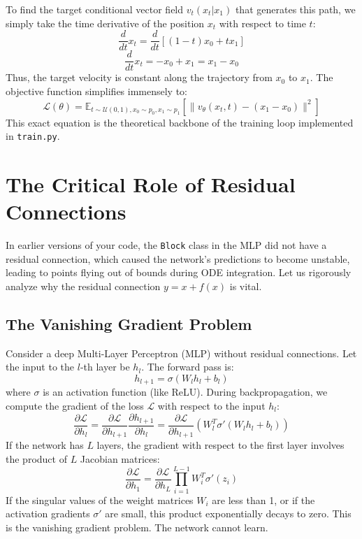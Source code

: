 \documentclass[12pt]{article}
\begin{document}
To find the target conditional vector field $v_t(x_t | x_1)$ that generates this path, we simply take the time derivative of the position $x_t$ with respect to time $t$:
\begin{equation}
    \frac{d}{dt}x_t = \frac{d}{dt} \left[ (1 - t)x_0 + t x_1 \right]
\end{equation}
\begin{equation}
    \frac{d}{dt}x_t = -x_0 + x_1 = x_1 - x_0
\end{equation}
Thus, the target velocity is constant along the trajectory from $x_0$ to $x_1$. The objective function simplifies immensely to:
\begin{equation}
    \mathcal{L}(\theta) = \mathbb{E}_{t \sim \mathcal{U}(0,1), x_0 \sim p_0, x_1 \sim p_1} \left[ \| v_\theta(x_t, t) - (x_1 - x_0) \|^2 \right]
\end{equation}
This exact equation is the theoretical backbone of the training loop implemented in \texttt{train.py}.

\newpage
\section{The Critical Role of Residual Connections}
In earlier versions of your code, the \texttt{Block} class in the MLP did not have a residual connection, which caused the network's predictions to become unstable, leading to points flying out of bounds during ODE integration. Let us rigorously analyze why the residual connection $y = x + f(x)$ is vital.

\subsection{The Vanishing Gradient Problem}
Consider a deep Multi-Layer Perceptron (MLP) without residual connections. Let the input to the $l$-th layer be $h_{l}$. The forward pass is:
\begin{equation}
    h_{l+1} = \sigma(W_l h_l + b_l)
\end{equation}
where $\sigma$ is an activation function (like ReLU). During backpropagation, we compute the gradient of the loss $\mathcal{L}$ with respect to the input $h_l$:
\begin{equation}
    \frac{\partial \mathcal{L}}{\partial h_l} = \frac{\partial \mathcal{L}}{\partial h_{l+1}} \frac{\partial h_{l+1}}{\partial h_l} = \frac{\partial \mathcal{L}}{\partial h_{l+1}} \left( W_l^T \sigma'(W_l h_l + b_l) \right)
\end{equation}
If the network has $L$ layers, the gradient with respect to the first layer involves the product of $L$ Jacobian matrices:
\begin{equation}
    \frac{\partial \mathcal{L}}{\partial h_1} = \frac{\partial \mathcal{L}}{\partial h_L} \prod_{i=1}^{L-1} W_i^T \sigma'(z_i)
\end{equation}
If the singular values of the weight matrices $W_i$ are less than 1, or if the activation gradients $\sigma'$ are small, this product exponentially decays to zero. This is the vanishing gradient problem. The network cannot learn.
\end{document}
